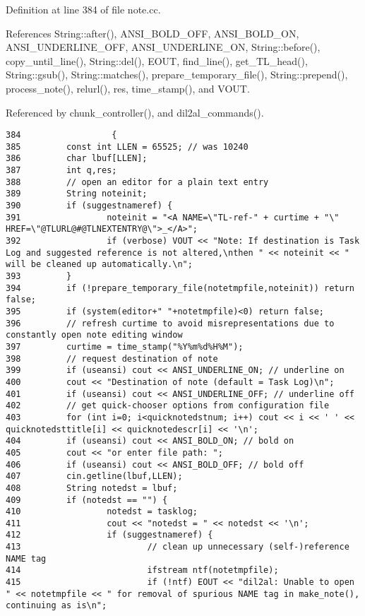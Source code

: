 Definition at line 384 of file note.cc.

References String::after(), ANSI\_\-BOLD\_\-OFF, ANSI\_\-BOLD\_\-ON, ANSI\_\-UNDERLINE\_\-OFF, ANSI\_\-UNDERLINE\_\-ON, String::before(), copy\_\-until\_\-line(), String::del(), EOUT, find\_\-line(), get\_\-TL\_\-head(), String::gsub(), String::matches(), prepare\_\-temporary\_\-file(), String::prepend(), process\_\-note(), relurl(), res, time\_\-stamp(), and VOUT.

Referenced by chunk\_\-controller(), and dil2al\_\-commands().



\footnotesize\begin{verbatim}384                  {
385         const int LLEN = 65525; // was 10240
386         char lbuf[LLEN];
387         int q,res;
388         // open an editor for a plain text entry
389         String noteinit;
390         if (suggestnameref) {
391                 noteinit = "<A NAME=\"TL-ref-" + curtime + "\" HREF=\"@TLURL@#@TLNEXTENTRY@\">_</A>";
392                 if (verbose) VOUT << "Note: If destination is Task Log and suggested reference is not altered,\nthen " << noteinit << " will be cleaned up automatically.\n";
393         }
394         if (!prepare_temporary_file(notetmpfile,noteinit)) return false;
395         if (system(editor+" "+notetmpfile)<0) return false;
396         // refresh curtime to avoid misrepresentations due to constantly open note editing window
397         curtime = time_stamp("%Y%m%d%H%M");
398         // request destination of note
399         if (useansi) cout << ANSI_UNDERLINE_ON; // underline on
400         cout << "Destination of note (default = Task Log)\n";
401         if (useansi) cout << ANSI_UNDERLINE_OFF; // underline off
402         // get quick-chooser options from configuration file
403         for (int i=0; i<quicknotedstnum; i++) cout << i << ' ' << quicknotedsttitle[i] << quicknotedescr[i] << '\n';
404         if (useansi) cout << ANSI_BOLD_ON; // bold on
405         cout << "or enter file path: ";
406         if (useansi) cout << ANSI_BOLD_OFF; // bold off
407         cin.getline(lbuf,LLEN);
408         String notedst = lbuf;
409         if (notedst == "") {
410                 notedst = tasklog;
411                 cout << "notedst = " << notedst << '\n';
412                 if (suggestnameref) {
413                         // clean up unnecessary (self-)reference NAME tag
414                         ifstream ntf(notetmpfile);
415                         if (!ntf) EOUT << "dil2al: Unable to open " << notetmpfile << " for removal of spurious NAME tag in make_note(), continuing as is\n";

\end{verbatim}
